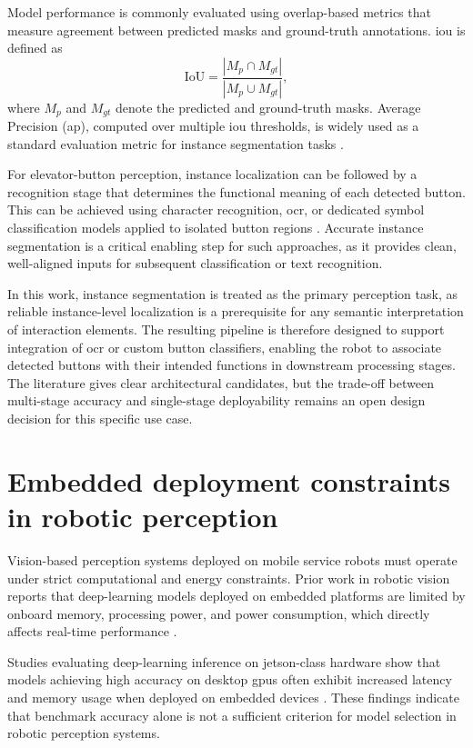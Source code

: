 Model performance is commonly evaluated using overlap-based metrics that measure
agreement between predicted masks and ground-truth annotations. \gls{iou} is defined as
\[
\mathrm{IoU} = \frac{|M_p \cap M_{gt}|}{|M_p \cup M_{gt}|},
\]
where $M_p$ and $M_{gt}$ denote the predicted and ground-truth masks. Average Precision
(\gls{ap}), computed over multiple \gls{iou} thresholds, is widely used as a standard evaluation
metric for instance segmentation tasks \citep{lin2014coco}.

For elevator-button perception, instance localization can be followed by a
recognition stage that determines the functional meaning of each detected button.
This can be achieved using character recognition, \gls{ocr}, or dedicated symbol
classification models applied to isolated button regions \citep{liu2021elevator}.
Accurate instance segmentation is a critical enabling step for such approaches, as
it provides clean, well-aligned inputs for subsequent classification or text
recognition.

In this work, instance segmentation is treated as the primary perception task, as
reliable instance-level localization is a prerequisite for any semantic
interpretation of interaction elements. The resulting pipeline is therefore
designed to support integration of \gls{ocr} or custom button classifiers, enabling the
robot to associate detected buttons with their intended functions in downstream
processing stages. The literature gives clear architectural candidates, but the
trade-off between multi-stage accuracy and single-stage deployability remains an
open design decision for this specific use case.

\section{Embedded deployment constraints in robotic perception}

Vision-based perception systems deployed on mobile service robots must operate
under strict computational and energy constraints. Prior work in robotic vision
reports that deep-learning models deployed on embedded platforms are limited by
onboard memory, processing power, and power consumption, which directly affects
real-time performance \citep{chen2018deeplearningrobots}.

Studies evaluating deep-learning inference on \gls{jetson}-class hardware show that
models achieving high accuracy on desktop \glspl{gpu} often exhibit increased latency and
memory usage when deployed on embedded devices \citep{kang2020edgeai}. These
findings indicate that benchmark accuracy alone is not a sufficient criterion for
model selection in robotic perception systems.

